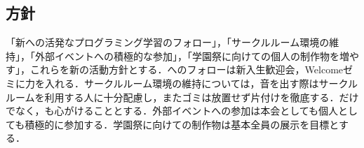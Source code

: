 \subsection*{\newGradeIfKouki{}\secondGrade{}方針}
「新\firstGrade{}への活発なプログラミング学習のフォロー」，「サークルルーム環境の維持」，「外部イベントへの積極的な参加」，「学園祭に向けての個人の制作物を増やす」，これらを新\secondGrade{}の活動方針とする．\firstGrade{}へのフォローは新入生歓迎会，Welcomeゼミに力を入れる．サークルルーム環境の維持については，音を出す際はサークルルームを利用する人に十分配慮し，またゴミは放置せず片付けを徹底する．\soumuStaff{}だけでなく，\secondGrade{}も心がけることとする．外部イベントへの参加は本会としても個人としても積極的に参加する．学園祭に向けての制作物は基本全員の展示を目標とする．
